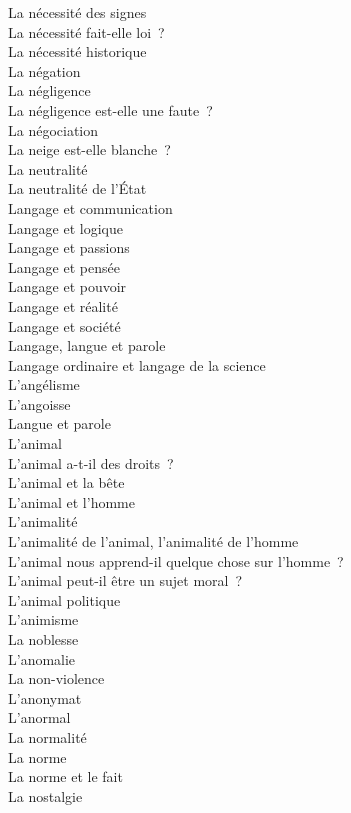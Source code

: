 \documentclass[a4paper,12pt]{article}
\begin{document}
La nécessité des signes \\
La nécessité fait-elle loi ? \\
La nécessité historique \\
La négation \\
La négligence \\
La négligence est-elle une faute ? \\
La négociation \\
La neige est-elle blanche ? \\
La neutralité \\
La neutralité de l'État \\
Langage et communication \\
Langage et logique \\
Langage et passions \\
Langage et pensée \\
Langage et pouvoir \\
Langage et réalité \\
Langage et société \\
Langage, langue et parole \\
Langage ordinaire et langage de la science \\
L'angélisme \\
L'angoisse \\
Langue et parole \\
L'animal \\
L'animal a-t-il des droits ? \\
L'animal et la bête \\
L'animal et l'homme \\
L'animalité \\
L'animalité de l'animal, l'animalité de l'homme \\
L'animal nous apprend-il quelque chose sur l'homme ? \\
L'animal peut-il être un sujet moral ? \\
L'animal politique \\
L'animisme \\
La noblesse \\
L'anomalie \\
La non-violence \\
L'anonymat \\
L'anormal \\
La normalité \\
La norme \\
La norme et le fait \\
La nostalgie \\
\end{document}
